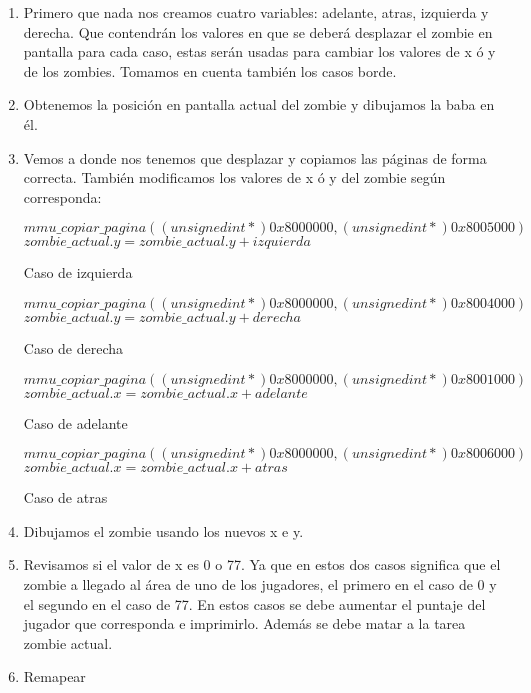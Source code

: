 \documentclass[a4paper]{article}
\begin{document}
\begin{enumerate}
  \item Primero que nada nos creamos cuatro variables: adelante, atras, izquierda y derecha. Que contendrán los valores en que se deberá desplazar el zombie en pantalla para cada caso, estas serán usadas para cambiar los valores de x ó y de los zombies. Tomamos en cuenta también los casos borde.
  \item Obtenemos la posición en pantalla actual del zombie y dibujamos la baba en él.
  \item Vemos a donde nos tenemos que desplazar y copiamos las páginas de forma correcta. También modificamos los valores de x ó y del zombie según corresponda:

  \begin{algorithm}[H]
    $mmu\_copiar\_pagina((unsigned int *) 0x8000000, (unsigned int *) 0x8005000)$\;
    $zombie\_actual.y = zombie\_actual.y + izquierda$\;
    \caption{Caso de izquierda}
    \end{algorithm} 

    \begin{algorithm}[H]
    $mmu\_copiar\_pagina((unsigned int *) 0x8000000, (unsigned int *) 0x8004000)$\;
    $zombie\_actual.y = zombie\_actual.y + derecha$\;
    \caption{Caso de derecha}
    \end{algorithm} 

    \begin{algorithm}[H]
    $mmu\_copiar\_pagina((unsigned int *) 0x8000000, (unsigned int *) 0x8001000)$\;
    $zombie\_actual.x = zombie\_actual.x + adelante$\;
    \caption{Caso de adelante}
    \end{algorithm} 

    \begin{algorithm}[H]
    $mmu\_copiar\_pagina((unsigned int *) 0x8000000, (unsigned int *) 0x8006000)$\;
    $zombie\_actual.x = zombie\_actual.x + atras$\;
    \caption{Caso de atras}
    \end{algorithm}

    \item Dibujamos el zombie usando los nuevos x e y.
    \item Revisamos si el valor de x es 0 o 77. Ya que en estos dos casos significa que el zombie a llegado al área de uno de los jugadores, el primero en el caso de 0 y el segundo en el caso de 77. En estos casos se debe aumentar el puntaje del jugador que corresponda e imprimirlo. Además se debe matar a la tarea zombie actual.
    \item Remapear
    \end{enumerate}
\end{document}
